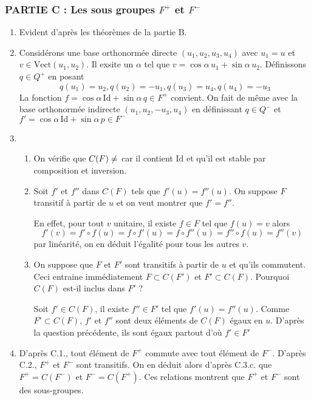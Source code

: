 \subsubsection*{PARTIE C : Les sous groupes $F^{+}$ et $F^{-}$}
\begin{enumerate}
\item Evident d'après les théorèmes de la partie B.
\item Considérons une base orthonormée directe $(u_{1},u_{2},u_{3},u_{4})$ avec $u_{1}=u$ et $v\in \mathrm{Vect}(u_{1},u_{2})$. Il exsite un $\alpha$ tel que $v=\cos\alpha\,u_{1}+\sin\alpha\,u_{2}$. Définissons $q\in Q^{+}$ en posant
\[q(u_{1})=u_{2}, q(u_{2})=-u_{1}, q(u_{3})=u_{4}, q(u_{4})=-u_{3}\]
La fonction $f=\cos\alpha\,\mathrm{Id}+\sin\alpha\,q\in F^{+}$ convient. On fait de même avec la base orthonormée indirecte $(u_{1},u_{2},-u_{3},u_{4})$ en définissant $q\in Q^{-}$ et $f'=\cos\alpha\,\mathrm{Id}+\sin\alpha\,p\in F^{-}$
\item \begin{enumerate}
\item On vérifie que $C(F)\neq\empty$ car il contient $\mathrm{Id}$ et qu'il est stable par composition et inversion.
\item Soit $f'$ et $f''$ dans $ C(F)$ tels que $f'(u)=f''(u)$. On suppose $F$ transitif à partir de $u$ et on veut montrer que $f'=f''$.

En effet, pour tout $v$ unitaire, il existe $f \in F$ tel que $f(u)=v$ alors
\[f'(v)=f'\circ f(u)= f\circ f'(u)= f\circ f''(u)= f''\circ f(u)=f''(v)\]
par linéarité, on en déduit l'égalité pour tous les autres $v$.
\item On suppose que $F$ et $F'$ sont transitifs à partir de $u$ et qu'ils commutent. Ceci entraine immédiatement $F\subset C(F')$ et $F'\subset C(F)$. Pourquoi $C(F)$ est-il inclus dans $F'$ ?

Soit $f'\in C(F)$, il existe $f''\in F'$ tel que $f'(u)=f''(u)$. Comme $F'\subset C(F)$, $f'$ et $f''$ sont deux éléments de $C(F)$ égaux en $u$. D'après la question précédente, ils sont égaux partout d'où $f'\in F'$
\end{enumerate}
\item D'après C.1., tout élément de $F^{+}$ commute avec tout élément de $F^{-}$. D'après C.2., $F^{+}$ et $F^{-}$ sont transitifs. On en déduit alors d'après C.3.c. que $F^{+}=C(F^{-})$ et $F^{-}=C(F^{+})$. Ces relations montrent que $F^{+}$ et $F^{-}$ sont des sous-groupes.


\end{enumerate}
